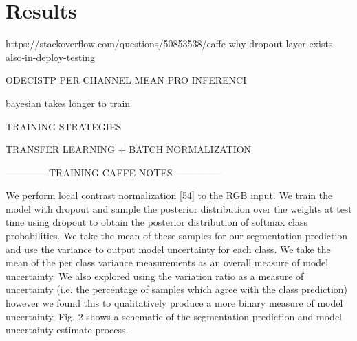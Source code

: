 \chapter{Results}

https://stackoverflow.com/questions/50853538/caffe-why-dropout-layer-exists-also-in-deploy-testing

ODECISTP PER CHANNEL MEAN PRO INFERENCI

bayesian takes longer to train

TRAINING STRATEGIES

TRANSFER LEARNING + BATCH NORMALIZATION

--------------TRAINING CAFFE NOTES---------------

We perform local contrast normalization [54] to the RGB input. 
We train the model with dropout and sample the posterior distribution over the weights at test time using dropout
to obtain the posterior distribution of softmax class probabilities. We take the mean of these samples for our segmentation prediction and use the variance to output model
uncertainty for each class. We take the mean of the per class
variance measurements as an overall measure of model uncertainty. We also explored using the variation ratio as
a measure of uncertainty (i.e. the percentage of samples
which agree with the class prediction) however we found
this to qualitatively produce a more binary measure of
model uncertainty. Fig. 2 shows a schematic of the segmentation prediction and model uncertainty estimate process.